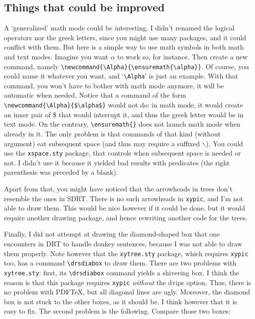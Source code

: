 \documentclass[a4paper]{article}
\begin{document}
\subsection{Things that could be improved}

A `generalized' math mode could be interesting. I didn't renamed the logical operators nor the greek letters, since you might use many packages, and it could conflict with them. But here is a simple way to use math symbols in both math and text modes. Imagine you want $\alpha$ to work so, for instance. Then create a new command, namely \verb+\newcommand{\Alpha}{\ensuremath{\alpha}}+. Of course, you could name it whatever you want, and `\verb+\Alpha+' is just an example. With that command, you won't have to bother with math mode anymore, it will be automatic when needed. Notice that a command of the form \verb+\newcommand{\Alpha}{$\alpha$}+ would not do: in math mode, it would create an inner pair of \$ that would interrupt it, and thus the greek letter would be in text mode. On the contrary, \verb+\ensuremath{}+ does not launch math mode when already in it. The only problem is that commands of that kind (without argument) eat subsequent space (and thus may require a suffixed $\backslash$). You could use the \verb+xspace.sty+ package, that controls when subsequent space is needed or not. I didn't use it because it yielded bad results with predicates (the right parenthesis was preceded by a blank).

Apart from that, you might have noticed that the arrowheads in trees don't resemble the ones in SDRT. There is no such arrowheads in \verb+xypic+, and I'm not able to draw them. This would be nice however if it could be done, but  it would require another drawing package, and hence rewriting another code for the trees.

Finally, I did not attempt at drawing the diamond-shaped box that one encounters in DRT to handle donkey sentences, because I was not able to draw them properly. Note however that the \verb+xytree.sty+ package, which requires \verb+xypic+ too, has a command \verb+\drsdiabox+ to draw them. There are two problems with \verb+xytree.sty+: first, its \verb+\drsdiabox+ command yields a shivering box. I think the reason is that this package requires \verb+xypic+ \emph{without} the dvips option. Thus, there is no problem with PDFTeX, but all diagonal lines are ugly. Moreover, the diamond box is not stuck to the other boxes, as it should be. I think however that it is easy to fix. The second problem is the following. Compare those two boxes: 
\end{document}
